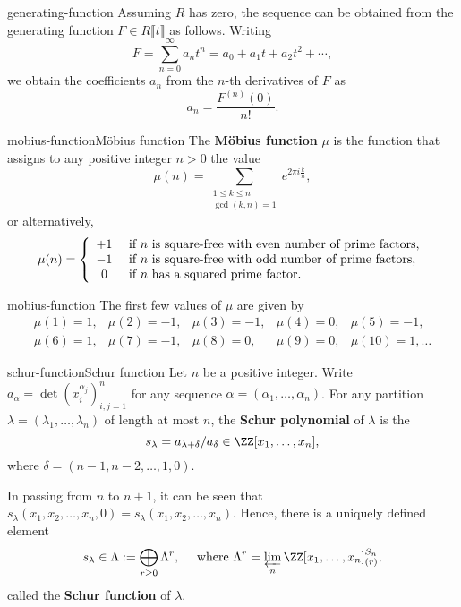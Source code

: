 \begin{example}{generating-function}
    Assuming $R$ has  zero, the sequence can be obtained from the generating function $F \in R \llbracket t \rrbracket$ as follows. Writing
    \[ F = \sum_{n = 0}^{\infty} a_n t^n = a_0 + a_1 t + a_2 t^2 + \cdots , \]
    we obtain the coefficients $a_n$ from the $n$-th derivatives of $F$ as
    \[ a_n = \frac{F^{(n)}(0)}{n!} . \]
\end{example}

\begin{topic}{mobius-function}{Möbius function}
    The \textbf{Möbius function} $\mu$ is the function that assigns to any positive integer $n > 0$ the value
    \[ \mu(n) = \sum_{\substack{1 \le k \le n \\ \gcd(k, n) = 1}} e^{2\pi i \frac{k}{n}} , \]
    or alternatively,
    \[ \mu(n) = \left\{ \begin{array}{cl}
         +1 & \textup{ if $n$ is square-free with even number of prime factors}, \\
         -1 & \textup{ if $n$ is square-free with odd number of prime factors}, \\
         0 & \textup{ if $n$ has a squared prime factor}.
    \end{array} \right. \]
\end{topic}

\begin{example}{mobius-function}
    The first few values of $\mu$ are given by
    \[ \begin{array}{lllll}
        \mu(1) = 1, & \mu(2) = -1, & \mu(3) = -1, & \mu(4) = 0, & \mu(5) = -1, \\
        \mu(6) = 1, & \mu(7) = -1, & \mu(8) = 0, & \mu(9) = 0, & \mu(10) = 1, \ldots
    \end{array} \]
\end{example}

\begin{topic}{schur-function}{Schur function}
    Let $n$ be a positive integer. Write $a_\alpha = \det(x_i^{\alpha_j})_{i, j = 1}^{n}$ for any sequence $\alpha = (\alpha_1, \ldots, \alpha_n)$. For any partition $\lambda = (\lambda_1, \ldots, \lambda_n)$ of length at most $n$, the \textbf{Schur polynomial} of $\lambda$ is the 
    \[ s_\lambda = a_{\lambda + \delta} / a_\delta \in \ZZ[x_1, \ldots, x_n] , \]
    where $\delta = (n - 1, n - 2, \ldots, 1, 0)$.
    
    In passing from $n$ to $n + 1$, it can be seen that $s_\lambda(x_1, x_2, \ldots, x_n, 0) = s_\lambda(x_1, x_2, \ldots, x_n)$. Hence, there is a uniquely defined element
    \[ s_\lambda \in \Lambda := \bigoplus_{r \ge 0} \Lambda^r , \quad \textup{ where  } \Lambda^r = \varprojlim_n \ZZ[x_1, \ldots, x_n]_{(r)}^{S_n} , \]
    called the \textbf{Schur function} of $\lambda$.
\end{topic}

